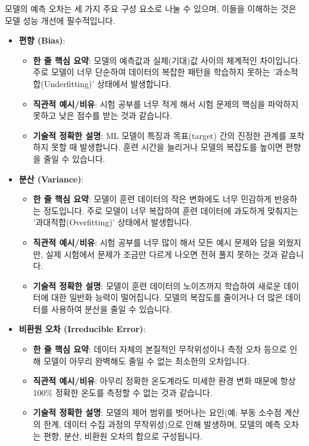 \documentclass[11pt,a4paper]{article}
\theoremstyle{definition}
\begin{document}
\begin{itemize}
모델의 예측 오차는 세 가지 주요 구성 요소로 나눌 수 있으며, 이들을 이해하는 것은 모델 성능 개선에 필수적입니다.

\begin{itemize}
    \item \textbf{편향 (Bias)}:
    \begin{itemize}
        \item \textbf{한 줄 핵심 요약}: 모델의 예측값과 실제(기대)값 사이의 체계적인 차이입니다. 주로 모델이 너무 단순하여 데이터의 복잡한 패턴을 학습하지 못하는 '과소적합(Underfitting)' 상태에서 발생합니다.
        \item \textbf{직관적 예시/비유}: 시험 공부를 너무 적게 해서 시험 문제의 핵심을 파악하지 못하고 낮은 점수를 받는 것과 같습니다.
        \item \textbf{기술적 정확한 설명}: ML 모델이 특징과 목표(target) 간의 진정한 관계를 포착하지 못할 때 발생합니다. 훈련 시간을 늘리거나 모델의 복잡도를 높이면 편향을 줄일 수 있습니다.
    \end{itemize}

    \item \textbf{분산 (Variance)}:
    \begin{itemize}
        \item \textbf{한 줄 핵심 요약}: 모델이 훈련 데이터의 작은 변화에도 너무 민감하게 반응하는 정도입니다. 주로 모델이 너무 복잡하여 훈련 데이터에 과도하게 맞춰지는 '과대적합(Overfitting)' 상태에서 발생합니다.
        \item \textbf{직관적 예시/비유}: 시험 공부를 너무 많이 해서 모든 예시 문제와 답을 외웠지만, 실제 시험에서 문제가 조금만 다르게 나오면 전혀 풀지 못하는 것과 같습니다.
        \item \textbf{기술적 정확한 설명}: 모델이 훈련 데이터의 노이즈까지 학습하여 새로운 데이터에 대한 일반화 능력이 떨어집니다. 모델의 복잡도를 줄이거나 더 많은 데이터를 사용하여 분산을 줄일 수 있습니다.
    \end{itemize}

    \item \textbf{비환원 오차 (Irreducible Error)}:
    \begin{itemize}
        \item \textbf{한 줄 핵심 요약}: 데이터 자체의 본질적인 무작위성이나 측정 오차 등으로 인해 모델이 아무리 완벽해도 줄일 수 없는 최소한의 오차입니다.
        \item \textbf{직관적 예시/비유}: 아무리 정확한 온도계라도 미세한 환경 변화 때문에 항상 100\% 정확한 온도를 측정할 수 없는 것과 같습니다.
        \item \textbf{기술적 정확한 설명}: 모델의 제어 범위를 벗어나는 요인(예: 부동 소수점 계산의 한계, 데이터 수집 과정의 무작위성)으로 인해 발생하며, 모델의 예측 오차는 편향, 분산, 비환원 오차의 합으로 구성됩니다.
    \end{itemize}


\end{itemize}
\end{itemize}
\end{document}
